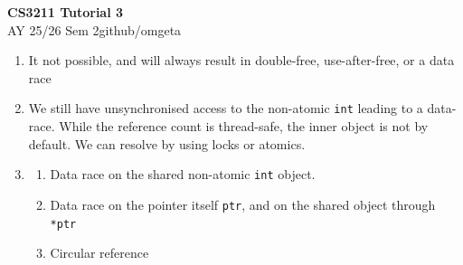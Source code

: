 \documentclass[12pt, a4paper]{article}
\newcommand{\mytitle}{CS3211 Tutorial 3}
\newcommand{\myauthor}{github/omgeta}
\newcommand{\mydate}{AY 25/26 Sem 2}
\begin{document}
\raggedright
\footnotesize
\begin{center}
{\normalsize{\textbf{\mytitle}}} \\
{\footnotesize{\mydate\hspace{2pt}\textemdash\hspace{2pt}\myauthor}}
\end{center}
\begin{enumerate}[Q\arabic*.]
  \item It not possible, and will always result in double-free, use-after-free, or a data race

  \item We still have unsynchronised access to the non-atomic \lstinline|int| leading to a data-race. While the reference count is thread-safe, the inner object is not by default. We can resolve by using locks or atomics.

  \item 
    \begin{enumerate}
      \item Data race on the shared non-atomic \lstinline|int| object.

      \item Data race on the pointer itself \lstinline|ptr|, and on the shared object through \lstinline|*ptr|

      \item Circular reference 
    \end{enumerate}
\end{enumerate}
\end{document}
